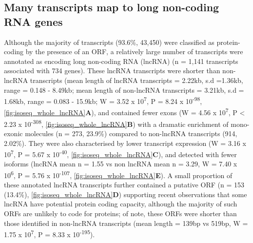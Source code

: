 \subsection{Many transcripts map to long non-coding RNA genes}
Although the majority of transcripts (93.6\%, 43,450) were classified as protein-coding by the presence of an ORF, a relatively large number of transcripts were annotated as encoding long non-coding RNA (lncRNA) (n = 1,141 transcripts associated with 734 genes). These lncRNA transcripts were shorter than non-lncRNA transcripts (mean length of lncRNA transcripts = 2.22kb, s.d =1.36kb, range = 0.148 - 8.49kb; mean length of non-lncRNA transcripts = 3.21kb, s.d = 1.68kb, range = 0.083 - 15.9kb; W = 3.52 x 10\textsuperscript{7}, P = 8.24 x 10\textsuperscript{-98}, \cref{fig:isoseq_whole_lncRNA}\textbf{A}), and contained fewer exons\cite{Statello2020} (W = 4.56 x 10\textsuperscript{7}, P < 2.23 x 10\textsuperscript{-308}, \cref{fig:isoseq_whole_lncRNA}\textbf{B}) with a dramatic enrichment of mono-exonic molecules\cite{Kuo2017} (n = 273, 23.9\%) compared to non-lncRNA transcripts (914, 2.02\%). They were also characterised by lower transcript expression\cite{Statello2020, Liu2016a} (W = 3.16 x 10\textsuperscript{7}, P = 5.67 x 10\textsuperscript{-40}, \cref{fig:isoseq_whole_lncRNA}\textbf{C}), and detected with fewer isoforms (lncRNA mean n = 1.55 vs non lncRNA mean n = 3.29, W = 7.40 x 10\textsuperscript{6}, P = 5.76 x 10\textsuperscript{-107}, \cref{fig:isoseq_whole_lncRNA}\textbf{E}). A small proportion of these annotated lncRNA transcripts further contained a putative ORF (n = 153 (13.4\%), \cref{fig:isoseq_whole_lncRNA}\textbf{D}) supporting recent observations that some lncRNA have potential protein coding capacity\cite{Kageyama2011}, although the majority of such ORFs are unlikely to code for proteins\cite{Guttman2013}; of note, these ORFs were shorter than those identified in non-lncRNA transcripts (mean length = 139bp vs 519bp, W = 1.75 x 10\textsuperscript{7}, P = 8.33 x 10\textsuperscript{-195}). 

